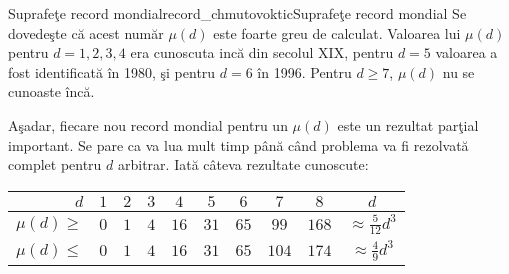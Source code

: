 \begin{surferIntroPage}{Suprafe\c{t}e record mondial}{record_chmutovoktic}{Suprafe\c{t}e record mondial}
   Se dovede\c{s}te c\u{a} acest num\u{a}r $\mu(d)$ este foarte greu de calculat.
   Valoarea lui $\mu(d)$ pentru $d=1,2,3,4$ era cunoscuta inc\u{a} din secolul XIX,
   pentru $d=5$ valoarea a fost identificat\u{a} \^{i}n 1980, \c{s}i pentru $d=6$ \^{i}n 1996.
   Pentru $d\ge 7$, $\mu(d)$ nu se cunoaste \^{i}nc\u{a}.
   
   A\c{s}adar, fiecare nou record mondial pentru un $\mu(d)$ este un rezultat par\c{t}ial important.
   Se pare ca va lua mult timp p\^{a}n\u{a} c\^{a}nd problema va fi rezolvat\u{a} complet pentru $d$
   arbitrar. Iat\u{a} c\^{a}teva rezultate cunoscute:
    
   \begin{center}
      \begin{tabular}{r|cccccccc|c}
        $d$ & $1$ & $2$ & $3$ & $4$ & $5$ & $6$ & $7$ & $8$ & $d$\\
        \hline
        \hline
        \rule{0pt}{1.2em}$\mu(d)\ge$ & $0$ & $1$ & $4$ & $16$ & $31$ & $65$ &
        $99$ & $168$ &
        $\approx \frac{5}{12}d^3$\\[0.3em]
        \hline
        \rule{0pt}{1.2em}$\mu(d)\le$ & $0$ & $1$ & $4$ & $16$ & $31$ & $65$ &
        $104$ & $174$ & $\approx \frac{4}{9}d^3$
      \end{tabular}
    \end{center}
\end{surferIntroPage}
